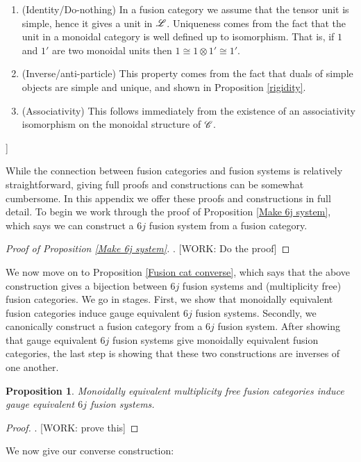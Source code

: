 \documentclass{article}
\newtheorem{proposition}{Proposition}[section]
\theoremstyle{definition}
\numberwithin{figure}{section}
\begin{document}
\begin{enumerate}
\item (Identity/Do-nothing) In a fusion category we assume that the tensor unit is simple, hence it gives a unit in $\mathscr{L}$. Uniqueness comes from the fact that the unit in a monoidal category is well defined up to isomorphism. That is, if $1$ and $1'$ are two monoidal units then $1\cong 1\otimes 1'\cong 1'$.

\item (Inverse/anti-particle) This property comes from the fact that duals of simple objects are simple and unique, and shown in Proposition \ref{rigidity}. 

\item (Associativity) This follows immediately from the existence of an associativity isomorphism on the monoidal structure of $\mathscr{C}$.
\end{enumerate}]

While the connection between fusion categories and fusion systems is relatively straightforward, giving full proofs and constructions can be somewhat cumbersome. In this appendix we offer these proofs and constructions in full detail. To begin we work through the proof of Proposition \ref{Make 6j system}, which says we can construct a $6j$ fusion system from a fusion category.

\begin{proof}[Proof of Proposition \ref{Make 6j system}]. [WORK: Do the proof]
\end{proof}


We now move on to Proposition \ref{Fusion cat converse}, which says that the above construction gives a bijection between $6j$ fusion systems and (multiplicity free) fusion categories. We go in stages. First, we show that monoidally equivalent fusion categories induce gauge equivalent $6j$ fusion systems. Secondly, we canonically construct a fusion category from a $6j$ fusion system. After showing that gauge equivalent $6j$ fusion systems give monoidally equivalent fusion categories, the last step is showing that these two constructions are inverses of one another.

\begin{proposition} Monoidally equivalent multiplicity free fusion categories induce gauge equivalent $6j$ fusion systems.
\end{proposition}
\begin{proof}. [WORK: prove this]
\end{proof}

We now give our converse construction:
\end{document}
